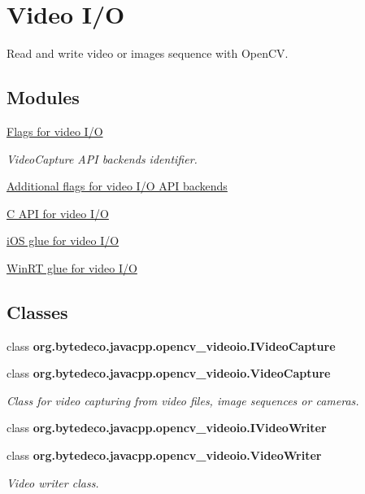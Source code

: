 \hypertarget{group__videoio}{}\section{Video I/O}
\label{group__videoio}


Read and write video or images sequence with Open\+CV.  


\subsection*{Modules}
\begin{DoxyCompactItemize}
\item 
\hyperlink{group__videoio__flags__base}{Flags for video I/O}
\begin{DoxyCompactList}\small\item\em Video\+Capture A\+PI backends identifier. \end{DoxyCompactList}\item 
\hyperlink{group__videoio__flags__others}{Additional flags for video I/\+O A\+P\+I backends}
\item 
\hyperlink{group__videoio__c}{C A\+P\+I for video I/O}
\item 
\hyperlink{group__videoio__ios}{i\+O\+S glue for video I/O}
\item 
\hyperlink{group__videoio__winrt}{Win\+R\+T glue for video I/O}
\end{DoxyCompactItemize}
\subsection*{Classes}
\begin{DoxyCompactItemize}
\item 
class {\bfseries org.\+bytedeco.\+javacpp.\+opencv\+\_\+videoio.\+I\+Video\+Capture}
\item 
class {\bfseries org.\+bytedeco.\+javacpp.\+opencv\+\_\+videoio.\+Video\+Capture}
\begin{DoxyCompactList}\small\item\em Class for video capturing from video files, image sequences or cameras. \end{DoxyCompactList}\item 
class {\bfseries org.\+bytedeco.\+javacpp.\+opencv\+\_\+videoio.\+I\+Video\+Writer}
\item 
class {\bfseries org.\+bytedeco.\+javacpp.\+opencv\+\_\+videoio.\+Video\+Writer}
\begin{DoxyCompactList}\small\item\em Video writer class. \end{DoxyCompactList}\end{DoxyCompactItemize}


